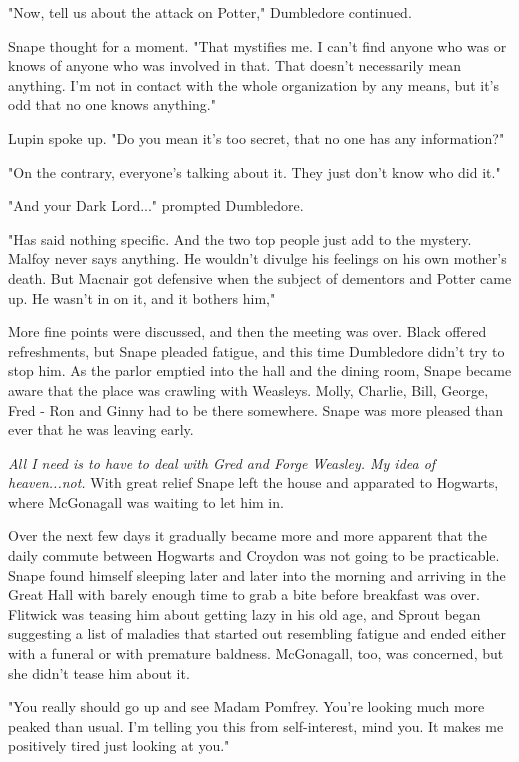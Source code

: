 \documentclass[a4paper,11pt]{article}
\begin{document}
"Now, tell us about the attack on Potter," Dumbledore continued.

Snape thought for a moment. "That mystifies me. I can't find anyone who was or knows of anyone who was involved in that. That doesn't necessarily mean anything. I'm not in contact with the whole organization by any means, but it's odd that no one knows anything."

Lupin spoke up. "Do you mean it's too secret, that no one has any information?"

"On the contrary, everyone's talking about it. They just don't know who did it."

"And your Dark Lord..." prompted Dumbledore.

"Has said nothing specific. And the two top people just add to the mystery. Malfoy never says anything. He wouldn't divulge his feelings on his own mother's death. But Macnair got defensive when the subject of dementors and Potter came up. He wasn't in on it, and it bothers him,"

More fine points were discussed, and then the meeting was over. Black offered refreshments, but Snape pleaded fatigue, and this time Dumbledore didn't try to stop him. As the parlor emptied into the hall and the dining room, Snape became aware that the place was crawling with Weasleys. Molly, Charlie, Bill, George, Fred - Ron and Ginny had to be there somewhere. Snape was more pleased than ever that he was leaving early.

\emph{All I need is to have to deal with Gred and Forge Weasley. My idea of heaven...not.} With great relief Snape left the house and apparated to Hogwarts, where McGonagall was waiting to let him in.

Over the next few days it gradually became more and more apparent that the daily commute between Hogwarts and Croydon was not going to be practicable. Snape found himself sleeping later and later into the morning and arriving in the Great Hall with barely enough time to grab a bite before breakfast was over. Flitwick was teasing him about getting lazy in his old age, and Sprout began suggesting a list of maladies that started out resembling fatigue and ended either with a funeral or with premature baldness. McGonagall, too, was concerned, but she didn't tease him about it.

"You really should go up and see Madam Pomfrey. You're looking much more peaked than usual. I'm telling you this from self-interest, mind you. It makes me positively tired just looking at you."
\end{document}
